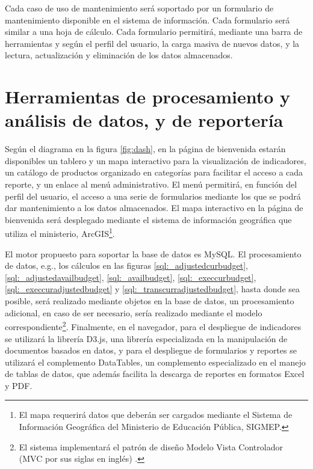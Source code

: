 \documentclass{article}
\begin{document}
\begin{multicols}{6}[]
Cada caso de uso de mantenimiento ser\'a soportado por un formulario de mantenimiento disponible en el sistema de informaci\'on. Cada formulario ser\'a similar a una hoja de c\'alculo. Cada formulario permitir\'a, mediante una barra de herramientas y seg\'un el perfil del usuario, la carga masiva de nuevos datos, y la lectura, actualizaci\'on y eliminaci\'on de los datos almacenados.

\section{Herramientas de procesamiento y an\'alisis de datos, y de reporter\'ia} \label{sec:tools}


Seg\'un el diagrama en la figura \ref{fig:dash}, en la p\'agina de bienvenida estar\'an disponibles un tablero y un mapa interactivo para la visualizaci\'on de indicadores, un cat\'alogo de productos organizado en categor\'ias para facilitar el acceso a cada reporte, y un enlace al men\'u administrativo. El men\'u permitir\'a, en funci\'on del perfil del usuario, el acceso a una serie de formularios mediante los que se podr\'a dar mantenimiento a los datos almacenados. El mapa interactivo en la p\'agina de bienvenida ser\'a desplegado mediante el sistema de informaci\'on geogr\'afica que utiliza el ministerio, ArcGIS\footnote{El mapa requerir\'a datos que deber\'an ser cargados mediante el Sistema de Informaci\'on Geogr\'afica del Ministerio de Educaci\'on P\'ublica, SIGMEP.}.

El motor propuesto para soportar la base de datos es MySQL. El procesamiento de datos, e.g., los c\'alculos en las figuras \ref{sql:_adjustedcurbudget}, \ref{sql:_adjustedavailbudget}, \ref{sql:_availbudget}, \ref{sql:_execcurbudget}, \ref{sql:_execcuradjustedbudget} y \ref{sql:_transcurradjustedbudget}, hasta donde sea posible, ser\'a realizado mediante objetos en la base de datos, un procesamiento adicional, en caso de ser necesario, ser\'ia realizado mediante el modelo correspondiente\footnote{El sistema implementar\'a el patr\'on de dise\~no Modelo Vista Controlador (MVC por sus siglas en ingl\'es) \cite{prop}.}. Finalmente, en el navegador, para el despliegue de indicadores se utilizar\'a la librer\'ia D3.js, una librer\'ia especializada en la manipulaci\'on de documentos basados en datos, y para el despliegue de formularios y reportes se utilizar\'a el complemento DataTables, un complemento especializado en el manejo de tablas de datos, que adem\'as facilita la descarga de reportes en formatos Excel y PDF.


\end{multicols}
\end{document}
